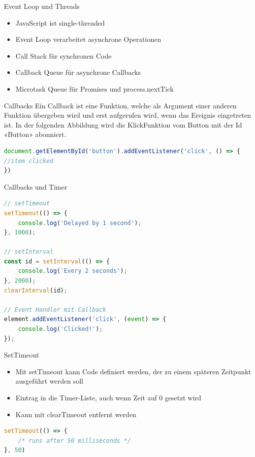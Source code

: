 \begin{concept}{Event Loop und Threads}
    \begin{itemize}
        \item JavaScript ist single-threaded
        \item Event Loop verarbeitet asynchrone Operationen
        \item Call Stack für synchronen Code
        \item Callback Queue für asynchrone Callbacks
        \item Microtask Queue für Promises und process.nextTick
    \end{itemize}
\end{concept}

\begin{definition}{Callbacks}
Ein Callback ist eine Funktion, welche als Argument einer anderen Funktion übergeben wird und erst aufgerufen wird, wenn das Ereignis eingetreten ist. 
In der folgenden Abbildung wird die KlickFunktion vom Button mit der Id «Button» abonniert.
\begin{lstlisting}[language=JavaScript, style=basesmol]
document.getElementById('button').addEventListener('click', () => {
//item clicked
})
\end{lstlisting}
\end{definition}

\begin{KR}{Callbacks und Timer}
\begin{lstlisting}[language=JavaScript, style=basesmol]
// setTimeout
setTimeout(() => {
    console.log('Delayed by 1 second');
}, 1000);

// setInterval
const id = setInterval(() => {
    console.log('Every 2 seconds');
}, 2000);
clearInterval(id);

// Event Handler mit Callback
element.addEventListener('click', (event) => {
    console.log('Clicked!');
});
\end{lstlisting}
\end{KR}

\begin{code}{SetTimeout}
\begin{itemize}
  \item Mit setTimeout kann Code definiert werden, der zu einem späteren Zeitpunkt ausgeführt werden soll
  \item Eintrag in die Timer-Liste, auch wenn Zeit auf 0 gesetzt wird
  \item Kann mit clearTimeout entfernt werden
\end{itemize}
\begin{lstlisting}[language=JavaScript, style=basesmol]
setTimeout(() => {
    /* runs after 50 milliseconds */
}, 50)
\end{lstlisting}
\end{code}


